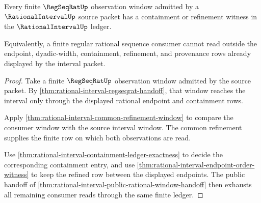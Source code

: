 \begin{theorem}
\label{thm:rationalinterval-regseqrat-window-coverage}
Every finite $\RegSeqRatUp$ observation window admitted by a
$\RationalIntervalUp$ source packet has a containment or refinement witness in
the $\RationalIntervalUp$ ledger.

Equivalently, a finite regular rational sequence consumer cannot read outside
the endpoint, dyadic-width, containment, refinement, and provenance rows
already displayed by the interval packet.
\end{theorem}
\begin{proof}
Take a finite $\RegSeqRatUp$ observation window admitted by the source packet.
By \autoref{thm:rational-interval-regseqrat-handoff}, that window reaches the
interval only through the displayed rational endpoint and containment rows.

Apply \autoref{thm:rational-interval-common-refinement-window} to compare the
consumer window with the source interval window. The common refinement supplies
the finite row on which both observations are read.

Use \autoref{thm:rational-interval-containment-ledger-exactness} to decide the
corresponding containment entry, and use
\autoref{thm:rational-interval-endpoint-order-witness} to keep the refined row
between the displayed endpoints. The public handoff of
\autoref{thm:rational-interval-public-rational-window-handoff} then exhausts
all remaining consumer reads through the same finite ledger.
\end{proof}


